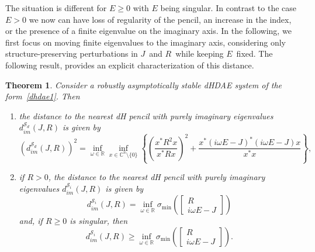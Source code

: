 \documentclass[11pt]{article}
\newcommand {\mat}[1]{\left[\begin{array}{#1}}
\newcommand {\rix}{\end{array}\right]}
\newtheorem{theorem}{Theorem}
\newcommand{\R}{\mathbb R}
\newcommand{\C}{\mathbb C}
\begin{document}
The situation is different for $E\geq 0$ with $E$ being singular. In contrast to the case $E>0$ we now can have loss of regularity of the pencil, an increase in the index, or the presence of a finite eigenvalue on the imaginary axis.
In the following, we first focus on moving finite eigenvalues to the imaginary axis, considering only structure-preserving perturbations in $J$ and $R$ while keeping $E$ fixed. The following result, provides an explicit characterization of this distance.
%
\begin{theorem}\label{thm:dist-imJR}
	Consider a robustly asymptotically stable dHDAE system of the form~\eqref{dhdae1}. Then
	\begin{enumerate}
		\item the distance to the nearest dH pencil with purely imaginary eigenvalues $d_{im}^{\mathcal S_d}(J,R)$ is given by
		\begin{equation}\label{eq:dist-imp}
			(d_{im}^{\mathcal S_d}(J,R))^2 = \inf_{\omega \in \R} \inf_{x\in \C^{n}\setminus \{0\}} \left\{\left(\frac{x^*R^2x}{x^*Rx} \right)^2+\frac{x^*(i\omega E -J)^*(i\omega E -J)x}{x^*x} \right\},
		\end{equation}
		\item if $R>0$, the distance to the nearest dH pencil with purely imaginary eigenvalues $d_{im}^{\mathcal S_i}(J,R)$ is given by
		\begin{equation*}
			d_{im}^{\mathcal S_i}(J,R)=\inf_{\omega\in \R} \sigma_{\min}\left( \mat{c}R\\i\omega E - J \rix \right)
		\end{equation*}
		and, if $R\geq 0$ is singular, then
		\begin{equation*}
			d_{im}^{\mathcal S_i}(J,R)\geq \inf_{\omega\in \R} \sigma_{\min}\left( \mat{c}R\\i\omega E - J \rix \right).
		\end{equation*}
	\end{enumerate}
\end{theorem}
\end{document}
